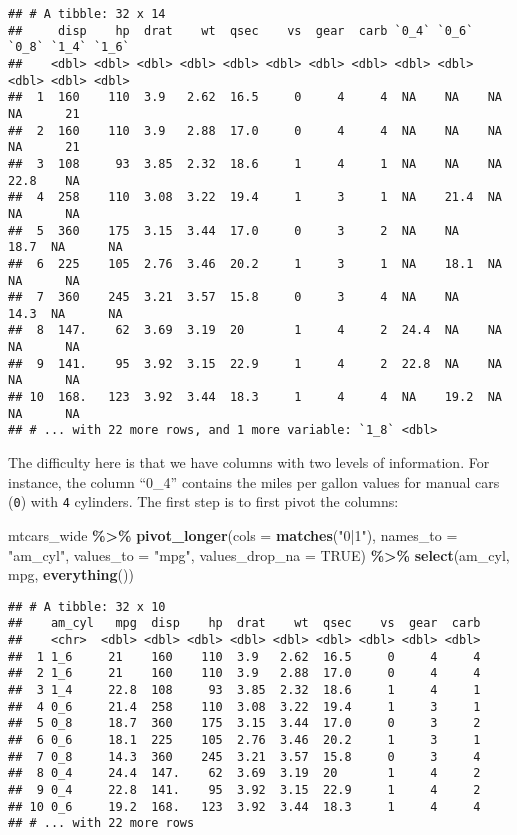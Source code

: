 \documentclass[
]{article}
\newenvironment{Shaded}{\begin{snugshade}}{\end{snugshade}}
\newcommand{\DataTypeTok}[1]{\textcolor[rgb]{0.13,0.29,0.53}{#1}}
\newcommand{\KeywordTok}[1]{\textcolor[rgb]{0.13,0.29,0.53}{\textbf{#1}}}
\newcommand{\NormalTok}[1]{#1}
\newcommand{\OperatorTok}[1]{\textcolor[rgb]{0.81,0.36,0.00}{\textbf{#1}}}
\newcommand{\OtherTok}[1]{\textcolor[rgb]{0.56,0.35,0.01}{#1}}
\newcommand{\StringTok}[1]{\textcolor[rgb]{0.31,0.60,0.02}{#1}}
\begin{document}
\begin{verbatim}
## # A tibble: 32 x 14
##     disp    hp  drat    wt  qsec    vs  gear  carb `0_4` `0_6` `0_8` `1_4` `1_6`
##    <dbl> <dbl> <dbl> <dbl> <dbl> <dbl> <dbl> <dbl> <dbl> <dbl> <dbl> <dbl> <dbl>
##  1  160    110  3.9   2.62  16.5     0     4     4  NA    NA    NA    NA      21
##  2  160    110  3.9   2.88  17.0     0     4     4  NA    NA    NA    NA      21
##  3  108     93  3.85  2.32  18.6     1     4     1  NA    NA    NA    22.8    NA
##  4  258    110  3.08  3.22  19.4     1     3     1  NA    21.4  NA    NA      NA
##  5  360    175  3.15  3.44  17.0     0     3     2  NA    NA    18.7  NA      NA
##  6  225    105  2.76  3.46  20.2     1     3     1  NA    18.1  NA    NA      NA
##  7  360    245  3.21  3.57  15.8     0     3     4  NA    NA    14.3  NA      NA
##  8  147.    62  3.69  3.19  20       1     4     2  24.4  NA    NA    NA      NA
##  9  141.    95  3.92  3.15  22.9     1     4     2  22.8  NA    NA    NA      NA
## 10  168.   123  3.92  3.44  18.3     1     4     4  NA    19.2  NA    NA      NA
## # ... with 22 more rows, and 1 more variable: `1_8` <dbl>
\end{verbatim}

The difficulty here is that we have columns with two levels of information. For instance, the
column ``0\_4'' contains the miles per gallon values for manual cars (\texttt{0}) with \texttt{4} cylinders.
The first step is to first pivot the columns:

\begin{Shaded}
\begin{Highlighting}[]
\NormalTok{mtcars\_wide }\OperatorTok{\%\textgreater{}\%}\StringTok{ }
\StringTok{  }\KeywordTok{pivot\_longer}\NormalTok{(}\DataTypeTok{cols =} \KeywordTok{matches}\NormalTok{(}\StringTok{"0|1"}\NormalTok{), }\DataTypeTok{names\_to =} \StringTok{"am\_cyl"}\NormalTok{, }\DataTypeTok{values\_to =} \StringTok{"mpg"}\NormalTok{, }\DataTypeTok{values\_drop\_na =} \OtherTok{TRUE}\NormalTok{) }\OperatorTok{\%\textgreater{}\%}\StringTok{ }
\StringTok{  }\KeywordTok{select}\NormalTok{(am\_cyl, mpg, }\KeywordTok{everything}\NormalTok{())}
\end{Highlighting}
\end{Shaded}

\begin{verbatim}
## # A tibble: 32 x 10
##    am_cyl   mpg  disp    hp  drat    wt  qsec    vs  gear  carb
##    <chr>  <dbl> <dbl> <dbl> <dbl> <dbl> <dbl> <dbl> <dbl> <dbl>
##  1 1_6     21    160    110  3.9   2.62  16.5     0     4     4
##  2 1_6     21    160    110  3.9   2.88  17.0     0     4     4
##  3 1_4     22.8  108     93  3.85  2.32  18.6     1     4     1
##  4 0_6     21.4  258    110  3.08  3.22  19.4     1     3     1
##  5 0_8     18.7  360    175  3.15  3.44  17.0     0     3     2
##  6 0_6     18.1  225    105  2.76  3.46  20.2     1     3     1
##  7 0_8     14.3  360    245  3.21  3.57  15.8     0     3     4
##  8 0_4     24.4  147.    62  3.69  3.19  20       1     4     2
##  9 0_4     22.8  141.    95  3.92  3.15  22.9     1     4     2
## 10 0_6     19.2  168.   123  3.92  3.44  18.3     1     4     4
## # ... with 22 more rows
\end{verbatim}
\end{document}

